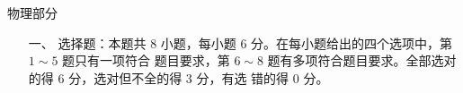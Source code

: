 
\begin{center}
\heiti 
{}
物理部分
\end{center}
\vspace{1em}


\begin{enumerate}
\heiti
\renewcommand{\labelenumi}{\arabic{enumi}.}
\item[一、]
选择题：本题共 $ 8 $ 小题，每小题 $ 6 $ 分。在每小题给出的四个选项中，第 $ 1 \sim 5 $ 题只有一项符合
题目要求，第 $ 6 \sim 8 $ 题有多项符合题目要求。全部选对的得 $ 6 $ 分，选对但不全的得 $ 3 $ 分，有选
错的得 $ 0 $ 分。




\end{enumerate}


